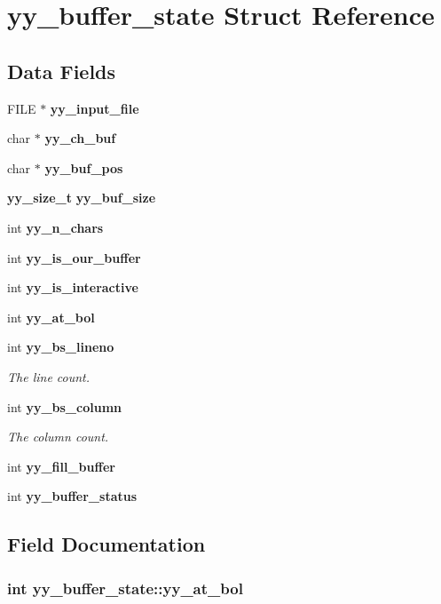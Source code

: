 \section{yy\_\-buffer\_\-state Struct Reference}
\label{structyy__buffer__state}
\subsection*{Data Fields}
\begin{CompactItemize}
\item 
FILE $\ast$ {\bf yy\_\-input\_\-file}
\item 
char $\ast$ {\bf yy\_\-ch\_\-buf}
\item 
char $\ast$ {\bf yy\_\-buf\_\-pos}
\item 
{\bf yy\_\-size\_\-t} {\bf yy\_\-buf\_\-size}
\item 
int {\bf yy\_\-n\_\-chars}
\item 
int {\bf yy\_\-is\_\-our\_\-buffer}
\item 
int {\bf yy\_\-is\_\-interactive}
\item 
int {\bf yy\_\-at\_\-bol}
\item 
int {\bf yy\_\-bs\_\-lineno}
\begin{CompactList}\small\item\em The line count. \item\end{CompactList}\item 
int {\bf yy\_\-bs\_\-column}
\begin{CompactList}\small\item\em The column count. \item\end{CompactList}\item 
int {\bf yy\_\-fill\_\-buffer}
\item 
int {\bf yy\_\-buffer\_\-status}
\end{CompactItemize}


\subsection{Field Documentation}
\subsubsection[{yy\_\-at\_\-bol}]{\setlength{\rightskip}{0pt plus 5cm}int {\bf yy\_\-buffer\_\-state::yy\_\-at\_\-bol}}\label{structyy__buffer__state_9d60c60af6e1a6f69de16871fd64f85f}




